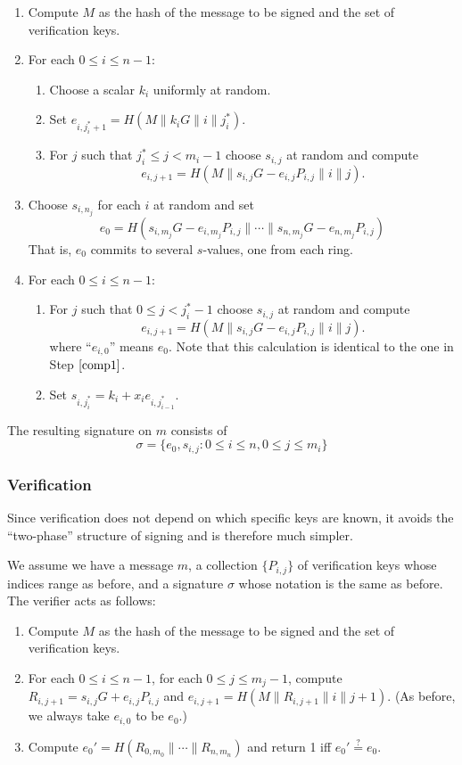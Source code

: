 \documentclass[letterpaper]{article}
\begin{document}
\begin{enumerate}
\item Compute $M$ as the hash of the message to be signed and the set of
verification keys.
\item For each $0\leq i\leq n-1$:
\begin{enumerate}
\item Choose a scalar $k_i$ uniformly at random.
\item Set $e_{i,j^*_i+1} = H(M\| k_iG \| i \| j^*_i)$.
\item For $j$ such that $j^*_i\leq j< m_i-1$ choose $s_{i,j}$ at random and
compute
\[ e_{i,j+1} = H(M\| s_{i,j}G - e_{i,j}P_{i,j} \| i \| j). \]
\label{comp1}
\end{enumerate}
\item Choose $s_{i,n_j}$ for each $i$ at random and set
\[ e_0 = H(s_{i,m_j}G - e_{i,m_j}P_{i,j} \| \cdots \| s_{n,m_j}G - e_{n,m_j}P_{i,j}) \]
That is, $e_0$ commits to several $s$-values, one from each ring.
\item For each $0\leq i\leq n-1$:
\begin{enumerate}
\item For $j$ such that $0\leq j< j^*_i-1$ choose $s_{i,j}$ at random and
compute
\[ e_{i,j+1} = H(M\| s_{i,j}G - e_{i,j}P_{i,j}\|i\|j). \]
where ``$e_{i,0}$'' means $e_0$. Note that this calculation is identical to
the one in Step $\ref{comp1}$.
\item Set $s_{i,j^*_i} = k_i + x_ie_{i,j^*_{i-1}}$.
\end{enumerate}
\end{enumerate}

The resulting signature on $m$ consists of
\[ \sigma = \{ e_0, s_{i, j} : 0\leq i\leq n, 0\leq j\leq m_i \} \]

\subsubsection{Verification}

Since verification does not depend on which specific keys are known, it
avoids the ``two-phase'' structure of signing and is therefore much
simpler.

We assume we have a message $m$, a collection $\{ P_{i,j} \}$ of verification
keys whose indices range as before, and a signature $\sigma$ whose notation
is the same as before. The verifier acts as follows:

\begin{enumerate}
\item Compute $M$ as the hash of the message to be signed and the set of
verification keys.
\item For each $0\leq i\leq n -1$,
      for each $0\leq j\leq m_j - 1$, compute $R_{i,j+1} = s_{i,j}G + e_{i,j}P_{i,j}$
and $e_{i,j+1} = H(M\|R_{i,j+1}\|i\|j+1)$. (As before, we always take $e_{i,0}$ to be $e_0$.)
\item Compute $e_0' = H(R_{0,m_0} \|\cdots \| R_{n,m_n})$ and return 1 iff $e_0'\stackrel{?}{=} e_0$.
\end{enumerate}
\end{document}

